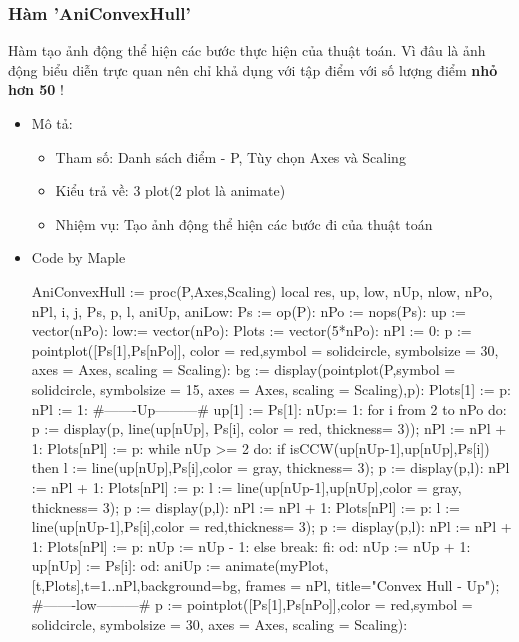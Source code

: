 \documentclass[12pt]{article}
\begin{document}
      \subsubsection{Hàm 'AniConvexHull'}
        Hàm tạo ảnh động thể hiện các bước thực hiện của thuật toán. Vì đâu là ảnh động biểu diễn trực quan nên chỉ khả dụng với tập điểm với số lượng điểm \textbf{nhỏ hơn 50} !
        \begin{itemize}
          \item Mô tả:
          \begin{itemize}
            \item Tham số: Danh sách điểm - P, Tùy chọn Axes và Scaling 
            \item Kiểu trả về: 3 plot(2 plot là animate) 
            \item Nhiệm vụ: Tạo ảnh động thể hiện các bước đi của thuật toán
          \end{itemize}
          \item Code by Maple
            \begin{spverbatim}
  AniConvexHull := proc(P,Axes,Scaling)
    local res, up, low, nUp, nlow, nPo, nPl, i, j, Ps, p, l, aniUp, aniLow:
    Ps := {op(P)}:
    nPo := nops(Ps):
    up := vector(nPo): low:= vector(nPo):
    Plots := vector(5*nPo):
    nPl := 0:
    p := pointplot([Ps[1],Ps[nPo]], color = red,symbol = solidcircle, symbolsize = 30, axes = Axes, scaling = Scaling):
    bg := display(pointplot(P,symbol = solidcircle, symbolsize = 15, axes = Axes, scaling = Scaling),p):
    Plots[1] := p: nPl := 1:
    #-------Up---------#
    up[1] := Ps[1]: nUp:= 1:
    for i from 2 to nPo do:
      p := display(p, line(up[nUp], Ps[i], color = red, thickness= 3));
      nPl := nPl + 1: Plots[nPl] := p:
      while nUp >= 2 do:
        if isCCW(up[nUp-1],up[nUp],Ps[i]) then
          l := line(up[nUp],Ps[i],color = gray, thickness= 3);
          p := display(p,l): nPl := nPl + 1: Plots[nPl] := p:
          l := line(up[nUp-1],up[nUp],color = gray, thickness= 3);
          p := display(p,l): nPl := nPl + 1: Plots[nPl] := p:
          l := line(up[nUp-1],Ps[i],color = red,thickness= 3);
          p := display(p,l): nPl := nPl + 1: Plots[nPl] := p:
          nUp := nUp - 1:
        else break: fi:
      od:
      nUp := nUp + 1: up[nUp] := Ps[i]:
    od:
    aniUp := animate(myPlot,[t,Plots],t=1..nPl,background=bg, frames = nPl, title="Convex Hull - Up");
    #-------low---------#
    p := pointplot([Ps[1],Ps[nPo]],color = red,symbol = solidcircle, symbolsize = 30, axes = Axes, scaling = Scaling):

\end{spverbatim}
\end{itemize}
\end{document}
